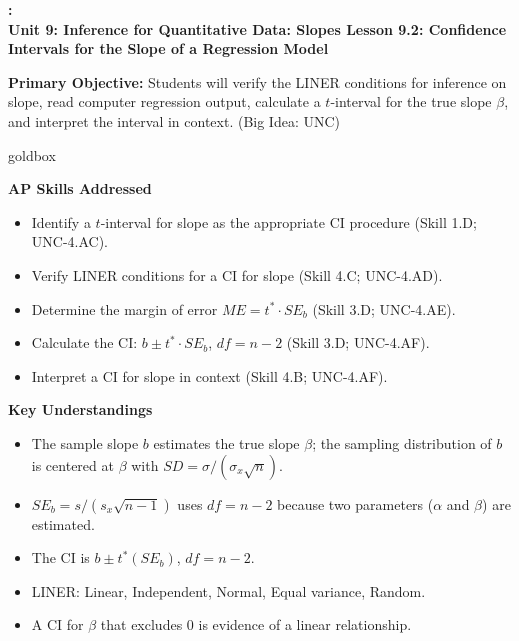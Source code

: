 \documentclass[10pt]{article}
\newcommand{\UnitNumberName}{Unit 9: Inference for Quantitative Data: Slopes \quad}
\newcommand{\LessonNumberName}{Lesson 9.2: Confidence Intervals for the Slope of a Regression Model}
\begin{document}
\begin{center}
    {\Large\bfseries \CourseName: \SchoolYear \\
    {\small\bfseries \UnitNumberName \LessonNumberName}}
\end{center}

\begin{tcolorbox}[colback=sky, colframe=navy, boxrule=0.9pt, arc=2mm,
    left=2mm, right=2mm, top=1.5mm, bottom=1.5mm]
    \textbf{Primary Objective:} Students will verify the LINER conditions for inference on
    slope, read computer regression output, calculate a $t$-interval for the true slope
    $\beta$, and interpret the interval in context. (Big Idea: UNC)
\end{tcolorbox}

\renewcommand{\arraystretch}{1.6}
\begin{skillbox}{goldbox}
\begin{minipage}[t]{0.48\linewidth}
    \textbf{AP Skills Addressed}
    \begin{itemize}
        \item Identify a $t$-interval for slope as the appropriate CI procedure
              (Skill 1.D; UNC-4.AC).
        \item Verify LINER conditions for a CI for slope (Skill 4.C; UNC-4.AD).
        \item Determine the margin of error $ME = t^* \cdot SE_b$ (Skill 3.D; UNC-4.AE).
        \item Calculate the CI: $b \pm t^* \cdot SE_b$, $df = n-2$ (Skill 3.D; UNC-4.AF).
        \item Interpret a CI for slope in context (Skill 4.B; UNC-4.AF).
    \end{itemize}
\end{minipage}
\hfill
\begin{minipage}[t]{0.48\linewidth}
    \textbf{Key Understandings}
    \begin{itemize}
        \item The sample slope $b$ estimates the true slope $\beta$; the sampling
              distribution of $b$ is centered at $\beta$ with $SD = \sigma/(\sigma_x\sqrt{n})$.
        \item $SE_b = s/(s_x\sqrt{n-1})$ uses $df = n-2$ because two parameters
              ($\alpha$ and $\beta$) are estimated.
        \item The CI is $b \pm t^*(SE_b)$, $df = n-2$.
        \item LINER: Linear, Independent, Normal, Equal variance, Random.
        \item A CI for $\beta$ that excludes 0 is evidence of a linear relationship.
    \end{itemize}
\end{minipage}
\end{skillbox}
\end{document}
